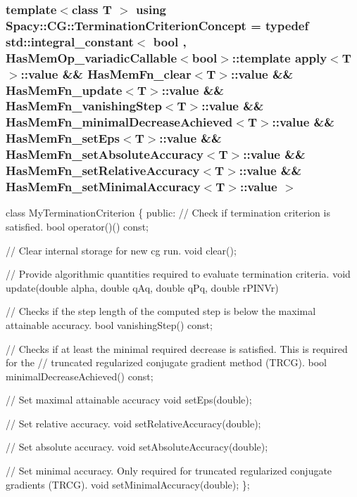 \subsubsection[{Termination\+Criterion\+Concept}]{\setlength{\rightskip}{0pt plus 5cm}template$<$class T $>$ using {\bf Spacy\+::\+C\+G\+::\+Termination\+Criterion\+Concept} = typedef std\+::integral\+\_\+constant$<$ bool , Has\+Mem\+Op\+\_\+variadic\+Callable$<$bool$>$\+::template apply$<$T$>$\+::value \&\& Has\+Mem\+Fn\+\_\+clear$<$T$>$\+::value \&\& Has\+Mem\+Fn\+\_\+update$<$T$>$\+::value \&\& Has\+Mem\+Fn\+\_\+vanishing\+Step$<$T$>$\+::value \&\& Has\+Mem\+Fn\+\_\+minimal\+Decrease\+Achieved$<$T$>$\+::value \&\& Has\+Mem\+Fn\+\_\+set\+Eps$<$T$>$\+::value \&\& Has\+Mem\+Fn\+\_\+set\+Absolute\+Accuracy$<$T$>$\+::value \&\& Has\+Mem\+Fn\+\_\+set\+Relative\+Accuracy$<$T$>$\+::value \&\& Has\+Mem\+Fn\+\_\+set\+Minimal\+Accuracy$<$T$>$\+::value $>$}\label{group__ConceptGroup_ga5a296e4942cbfeba1e8538594a6e9c26}
\label{group__ConceptGroup_CG_TerminationCriterionConceptAnchor}%
\hypertarget{group__ConceptGroup_CG_TerminationCriterionConceptAnchor}{}%
 
\begin{DoxyCode}
\textcolor{keyword}{class }MyTerminationCriterion
\{
\textcolor{keyword}{public}:
  \textcolor{comment}{// Check if termination criterion is satisfied.}
  \textcolor{keywordtype}{bool} operator()() \textcolor{keyword}{const};

  \textcolor{comment}{// Clear internal storage for new cg run.}
  \textcolor{keywordtype}{void} clear();

  \textcolor{comment}{// Provide algorithmic quantities required to evaluate termination criteria.}
  \textcolor{keywordtype}{void} update(\textcolor{keywordtype}{double} alpha, \textcolor{keywordtype}{double} qAq, \textcolor{keywordtype}{double} qPq, \textcolor{keywordtype}{double} rPINVr)

  \textcolor{comment}{// Checks if the step length of the computed step is below the maximal attainable accuracy.}
  \textcolor{keywordtype}{bool} vanishingStep() \textcolor{keyword}{const};

  \textcolor{comment}{// Checks if at least the minimal required decrease is satisfied. This is required for the}
  \textcolor{comment}{// truncated regularized conjugate gradient method (TRCG).}
  \textcolor{keywordtype}{bool} minimalDecreaseAchieved() \textcolor{keyword}{const};

  \textcolor{comment}{// Set maximal attainable accuracy}
  \textcolor{keywordtype}{void} setEps(\textcolor{keywordtype}{double});

  \textcolor{comment}{// Set relative accuracy.}
  \textcolor{keywordtype}{void} setRelativeAccuracy(\textcolor{keywordtype}{double});

  \textcolor{comment}{// Set absolute accuracy.}
  \textcolor{keywordtype}{void} setAbsoluteAccuracy(\textcolor{keywordtype}{double});

  \textcolor{comment}{// Set minimal accuracy. Only required for truncated regularized conjugate gradients (TRCG).}
  \textcolor{keywordtype}{void} setMinimalAccuracy(\textcolor{keywordtype}{double});
\};
\end{DoxyCode}



